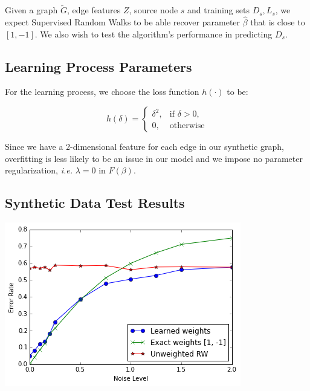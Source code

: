 \documentclass[10pt]{article}
\newenvironment{Figure}
  {\par\medskip\noindent\minipage{\linewidth}}
  {\endminipage\par\medskip}
\begin{document}
\begin{multicols}{2}
Given a graph $\tilde{G}$, edge features $Z$, source node $s$ and training sets $D_{s}, L_{s}$, we expect Supervised Random Walks to be able recover parameter $\hat{\beta}$ that is close to $\left[ 1, -1\right]$. We also wish to test the algorithm's performance in predicting $D_{s}$.

\subsection{Learning Process Parameters}

For the learning process, we choose the loss function $h(\cdot)$ to be:

\begin{displaymath}
h(\delta) =
\begin{cases}
	\delta^2, & \text{if } \delta>0, \\
	0, & \text{otherwise}
\end{cases}
\end{displaymath}

Since we have a 2-dimensional feature for each edge in our synthetic graph, overfitting is less likely to be an issue in our model and we impose no parameter regularization, \textit{i.e.} $\lambda = 0$ in $F(\beta)$.

\subsection{Synthetic Data Test Results}

\begin{Figure}
\centering
\includegraphics[width=\linewidth]{noise_plot}
\label{fig:syn_noise}
\end{Figure}


\end{multicols}
\end{document}

